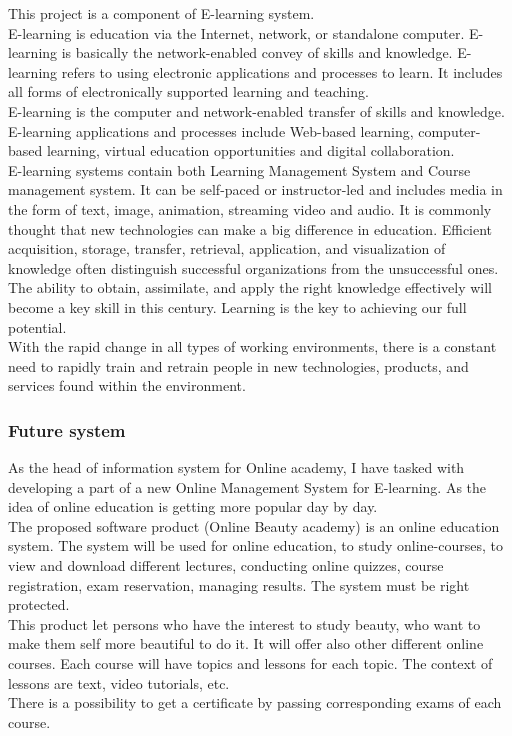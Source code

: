 \documentclass{scrartcl}
\begin{document}
This project is a component of E-learning system. \\
E-learning is education via the Internet, network, or standalone computer. E-learning is basically the network-enabled convey of skills and knowledge. E-learning refers to using electronic applications and processes to learn. It includes all forms of electronically supported learning and teaching.\\
 E-learning is the computer and network-enabled transfer of skills and knowledge. E-learning applications and processes include Web-based learning, computer-based learning, virtual education opportunities and digital collaboration.\\
E-learning systems contain both Learning Management System and Course management system. It can be self-paced or instructor-led and includes media in the form of text, image, animation, streaming video and audio. It is commonly thought that new technologies can make a big difference in education.
Efficient acquisition, storage, transfer, retrieval, application, and visualization of knowledge often distinguish successful organizations from the unsuccessful ones. The ability to obtain, assimilate, and apply the right knowledge effectively will become a key skill in this century. Learning is the key to achieving our full potential.\\
With the rapid change in all types of working environments, there is a constant need to rapidly train and retrain people in new technologies, products, and services found within the environment.\\
\subsubsection{Future system}

As the head of information system for Online academy, I have tasked with developing a part of a new Online Management System for E-learning. As the idea of online education is getting more popular day by day. \\
The proposed software product (Online Beauty academy) is an online education system. The system will be used for online education, to study online-courses, to view and download different lectures, conducting online quizzes, course registration, exam reservation, managing results. The system must be right protected.\\
This product let persons who have the interest to study beauty, who want to make them self more beautiful to do it. It will offer also other different online courses. 
 Each course will have topics and lessons for each topic. The context of lessons are text, video tutorials, etc. \\
 There is a possibility to get a certificate by passing corresponding exams of each course.
\end{document}
